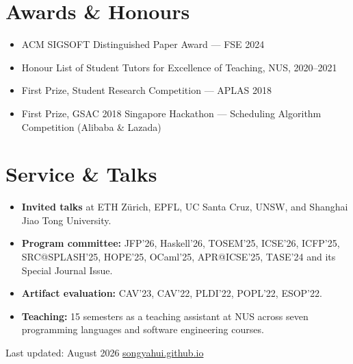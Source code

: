 \documentclass[11pt, a4paper]{article}
\begin{document}
\section{Awards \& Honours}

\begin{itemize}

  \item {ACM SIGSOFT Distinguished Paper Award} --- FSE 2024

  \item Honour List of Student Tutors for Excellence of Teaching, NUS, 2020--2021

  \item {First Prize, Student Research Competition} --- APLAS 2018

  \item {First Prize, GSAC 2018 Singapore Hackathon} --- Scheduling Algorithm Competition (Alibaba \& Lazada)

\end{itemize}

\section{Service \& Talks}
\begin{itemize}
  \item \textbf{Invited talks} at ETH Z\"{u}rich, EPFL,
        UC Santa Cruz, UNSW, and Shanghai Jiao Tong University.
  \item \textbf{Program committee:} JFP'26, Haskell'26, TOSEM'25, ICSE'26, ICFP'25, SRC@SPLASH'25, HOPE'25, OCaml'25,
        APR@ICSE'25, TASE'24 and its Special Journal Issue.
  \item \textbf{Artifact evaluation:} CAV'23, CAV'22, PLDI'22, POPL'22, ESOP'22.
  \item \textbf{Teaching:} 15 semesters as a teaching assistant at NUS across seven programming
        languages and software engineering courses.
\end{itemize}


\vfill
\begin{center}
  \textcolor{clrmuted}{\footnotesize Last updated: August 2026 \quad
  \href{https://songyahui.github.io}{songyahui.github.io}}
\end{center}
\end{document}
